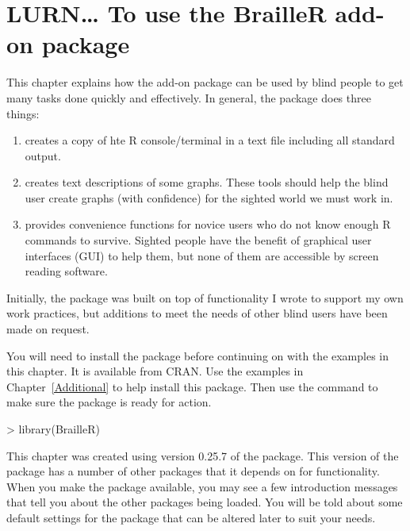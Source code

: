 



\chapter{LURN\ldots{} To use the BrailleR add-on package} 
\label{BrailleR} 
 



 
This chapter explains how the  add-on package can be used by blind people to get many tasks done quickly and effectively. In general, the package does three things:\begin{enumerate} 
\item creates a copy of hte R console/terminal in a text file including all standard output. 
\item creates text descriptions of some graphs. These tools should help the blind user create graphs (with confidence) for the sighted world we must work in. 
\item provides convenience functions for novice users who do not know enough R commands to survive. Sighted people have the benefit of graphical user interfaces (GUI) to help them, but none of them are accessible by screen reading software. 
\end{enumerate} 
Initially, the package was built on top of functionality I wrote to support my own work practices, but additions to meet the needs of other blind \R{} users have been made on request.  
 
 
You will need to install the  package before continuing on with the examples in this chapter. It is available from CRAN. Use the examples in Chapter~\ref{Additional} to help install this package. Then use the  command to make sure the package is ready for action. 

\begin{Schunk}
\begin{Sinput}
> library(BrailleR) 
\end{Sinput}
\end{Schunk}

This chapter was created using version 0.25.7 of the  package. This version of the package has a number of other packages that it depends on for functionality. When you make the  package available, you may see a few introduction messages that tell you about the other packages being loaded. You will be told about some default settings for the package that can be altered later to suit your needs. 
 
